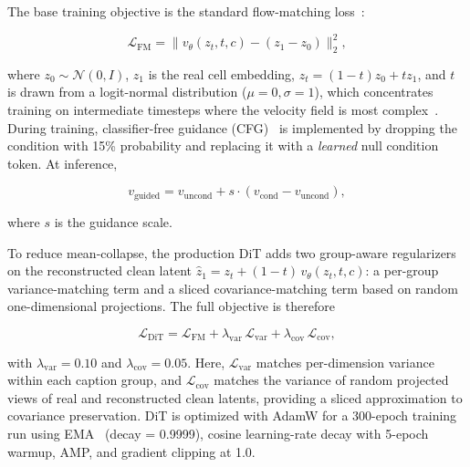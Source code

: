 \documentclass[genes,article,submit,pdftex,oneauthor]{Definitions/mdpi}
\begin{document}
The base training objective is the standard flow-matching loss~\cite{ref-flow-matching,ref-ot-cfm}:

\begin{linenomath}
\begin{equation}
\mathcal{L}_\text{FM} = \| v_\theta(z_t, t, c) - (z_1 - z_0) \|_2^2,
\label{eq:fm}
\end{equation}
\end{linenomath}

where $z_0 \sim \mathcal{N}(0, I)$, $z_1$ is the real cell embedding, $z_t = (1-t)z_0 + tz_1$, and $t$ is drawn from a logit-normal distribution ($\mu{=}0, \sigma{=}1$), which concentrates training on intermediate timesteps where the velocity field is most complex~\cite{ref-sd3}. During training, classifier-free guidance (CFG)~\cite{ref-cfg} is implemented by dropping the condition with 15\% probability and replacing it with a \emph{learned} null condition token. At inference,

\begin{linenomath}
\begin{equation}
v_\text{guided} = v_\text{uncond} + s \cdot (v_\text{cond} - v_\text{uncond}),
\label{eq:cfg}
\end{equation}
\end{linenomath}

where $s$ is the guidance scale.

To reduce mean-collapse, the production DiT adds two group-aware regularizers on the reconstructed clean latent $\hat{z}_1 = z_t + (1-t)\,v_\theta(z_t,t,c)$: a per-group variance-matching term and a sliced covariance-matching term based on random one-dimensional projections. The full objective is therefore

\begin{linenomath}
\begin{equation}
\mathcal{L}_\text{DiT} = \mathcal{L}_\text{FM} + \lambda_\text{var}\,\mathcal{L}_\text{var} + \lambda_\text{cov}\,\mathcal{L}_\text{cov},
\label{eq:var-loss}
\end{equation}
\end{linenomath}

with $\lambda_\text{var}=0.10$ and $\lambda_\text{cov}=0.05$. Here, $\mathcal{L}_\text{var}$ matches per-dimension variance within each caption group, and $\mathcal{L}_\text{cov}$ matches the variance of random projected views of real and reconstructed clean latents, providing a sliced approximation to covariance preservation. DiT is optimized with AdamW for a 300-epoch training run using EMA~\cite{ref-ema} (decay = 0.9999), cosine learning-rate decay with 5-epoch warmup, AMP, and gradient clipping at 1.0.
\end{document}
